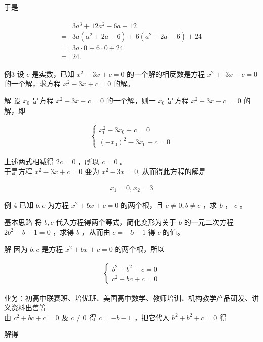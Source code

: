 \documentclass[10pt]{article}
\begin{document}
于是

\begin{align*}
\begin{aligned}
& 3 a^{3}+12 a^{2}-6 a-12 \\
= & 3 a\left(a^{2}+2 a-6\right)+6\left(a^{2}+2 a-6\right)+24 \\
= & 3 a \cdot 0+6 \cdot 0+24 \\
= & 24 .
\end{aligned}
\end{align*}

例3 设 $c$ 是实数，已知 $x^{2}-3 x+c=0$ 的一个解的相反数是方程 $x^{2}+$ $3 x-c=0$ 的一个解，求方程 $x^{2}-3 x+c=0$ 的解。

解 设 $x_{0}$ 是方程 $x^{2}-3 x+c=0$ 的一个解，则一 $x_{0}$ 是方程 $x^{2}+3 x-c=$ 0 的解，即

\begin{align*}
\left\{\begin{array}{l}
x_{0}^{2}-3 x_{0}+c=0 \\
\left(-x_{0}\right)^{2}-3 x_{0}-c=0
\end{array}\right.
\end{align*}

上述两式相减得 $2 c=0$ ，所以 $c=0$ 。\\
于是方程 $x^{2}-3 x+c=0$ 变为 $x^{2}-3 x=0$, 从而得此方程的解是

\begin{align*}
x_{1}=0, x_{2}=3
\end{align*}

例 4 已知 $b, c$ 为方程 $x^{2}+b x+c=0$ 的两个根，且 $c \neq 0, b \neq c$ ，求 $b$ ， $c$ 。

基本思路 将 $b, c$ 代入方程得两个等式，简化变形为关于 $b$ 的一元二次方程 $2 b^{2}-b-1=0$ ，求得 $b$ ，从而由 $c=-b-1$ 得 $c$ 的值。

解 因为 $b, c$ 是方程 $x^{2}+b x+c=0$ 的两个根，所以

\begin{align*}
\left\{\begin{array}{l}
b^{2}+b^{2}+c=0 \\
c^{2}+b c+c=0
\end{array}\right.
\end{align*}

业务：初高中联赛班、培优班、美国高中数学、教师培训、机构教学产品研发、讲义资料出售等\\
由 $c^{2}+b c+c=0$ 及 $c \neq 0$ 得 $c=-b-1$ ，把它代入 $b^{2}+b^{2}+c=0$ 得

解得
\end{document}
